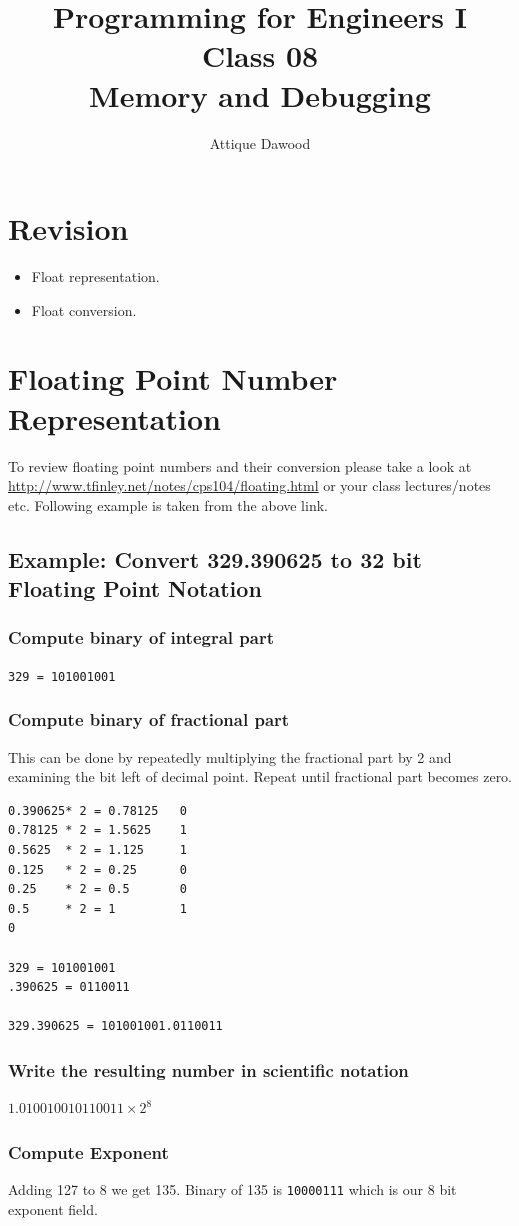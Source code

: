 \documentclass[12pt,a4paper]{article}
\title{\vspace{-2cm}Programming for Engineers I\\Class 08\\Memory and Debugging}
\author{Attique Dawood}
\begin{document}
\maketitle
\section{Revision}
\begin{itemize}
\item Float representation.
\item Float conversion.
\end{itemize}
\section{Floating Point Number Representation}
To review floating point numbers and their conversion please take a look at \url{http://www.tfinley.net/notes/cps104/floating.html} or your class lectures/notes etc. Following example is taken from the above link.
\subsection{Example: Convert 329.390625 to 32 bit Floating Point Notation}
\subsubsection{Compute binary of integral part}
\verb|329 = 101001001|
\subsubsection{Compute binary of fractional part}
This can be done by repeatedly multiplying the fractional part by 2 and examining the bit left of decimal point. Repeat until fractional part becomes zero.
\begin{verbatim}
0.390625* 2 = 0.78125   0
0.78125 * 2 = 1.5625    1
0.5625  * 2 = 1.125     1
0.125   * 2 = 0.25      0
0.25    * 2 = 0.5       0
0.5     * 2 = 1         1
0

329 = 101001001
.390625 = 0110011

329.390625 = 101001001.0110011
\end{verbatim}
\subsubsection{Write the resulting number in scientific notation}
$1.010010010110011 \times 2^8$
\subsubsection{Compute Exponent}
Adding 127 to 8 we get 135. Binary of 135 is \verb|10000111| which is our 8 bit exponent field.
\end{document}
